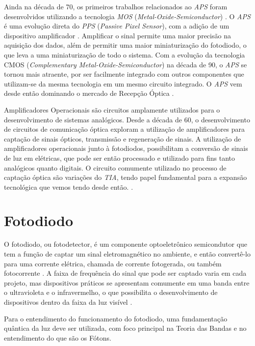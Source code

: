 Ainda na d\'ecada de 70, os primeiros trabalhos relacionados ao \emph{APS} foram desenvolvidos utilizando a tecnologia \emph{MOS} (\emph{Metal-Oxide-Semiconductor}) \cite{Peter}. O \emph{APS} \'e uma evolução direta do \emph{PPS} (\emph{Passive Pixel Sensor}), com a adição de um dispositivo amplificador \cite{EstevaoCoelho}. Amplificar o sinal permite uma maior precisão na aquisição dos dados, al\'em de permitir uma maior miniaturização do fotodiodo, o que leva a uma miniaturização de todo o sistema. Com a evolução da tecnologia CMOS (\emph{Complementary Metal-Oxide-Semiconductor}) na d\'ecada de 90, o \emph{APS} se tornou mais atraente, por ser facilmente integrado com outros componentes que utilizam-se da mesma tecnologia em um mesmo circuito integrado. O \emph{APS} vem desde então dominando o mercado de Recepção Óptica \cite{Andre, LidianeCampos}.

Amplificadores Operacionais s\~ao circuitos amplamente utilizados para o desenvolvimento de sistemas analógicos. Desde a década de 60, o desenvolvimento de circuitos de comunicação óptica exploram a utilização de amplificadores para captação de sinais ópticos, transmissão e regeneração de sinais. A utilização de amplificadores operacionais junto à fotodiodos, possibilitam a conversão de sinais de luz em elétricas, que pode ser então processado e utilizado para fins tanto analógicos quanto digitais. O circuito comumente utilizado no processo de captação óptica são variações do \emph{TIA}, tendo papel fundamental para a expansão tecnológica que vemos tendo desde então. \cite{ajoy, andrefontoura}.

\section{Fotodiodo}

O fotodiodo, ou fotodetector, \'e um componente optoeletrônico semicondutor que tem a função de captar um sinal eletromagn\'etico no ambiente, e então convertê-lo para uma corrente el\'etrica, chamada de corrente fotogerada, ou tamb\'em fotocorrente \cite{RazaviOpt}. A faixa de frequência do sinal que pode ser captado varia em cada projeto, mas dispositivos práticos se apresentam comumente em uma banda entre o ultravioleta e o infravermelho, o que possibilita o desenvolvimento de dispositivos dentro da faixa da luz visível \cite{LidianeCampos}.

Para o entendimento do funcionamento do fotodiodo, uma fundamentação quântica da luz deve ser utilizada, com foco principal na Teoria das Bandas e no entendimento do que são os Fótons.

